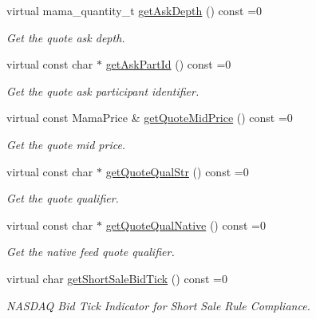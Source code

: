 \begin{CompactItemize}
virtual mama\_\-quantity\_\-t \hyperlink{classWombat_1_1MamdaQuoteUpdate_4728d3b913b7a8709feeb6863de56186}{get\-Ask\-Depth} () const =0
\begin{CompactList}\small\item\em Get the quote ask depth. \item\end{CompactList}\item 
virtual const char $\ast$ \hyperlink{classWombat_1_1MamdaQuoteUpdate_b1839344e3f8fa1339bffc169ed0fb2f}{get\-Ask\-Part\-Id} () const =0
\begin{CompactList}\small\item\em Get the quote ask participant identifier. \item\end{CompactList}\item 
virtual const Mama\-Price \& \hyperlink{classWombat_1_1MamdaQuoteUpdate_dacb69cdccb0a014856e8fadbcdf8c9c}{get\-Quote\-Mid\-Price} () const =0
\begin{CompactList}\small\item\em Get the quote mid price. \item\end{CompactList}\item 
virtual const char $\ast$ \hyperlink{classWombat_1_1MamdaQuoteUpdate_356eee4a4b6ba4480c542b8e93045cfb}{get\-Quote\-Qual\-Str} () const =0
\begin{CompactList}\small\item\em Get the quote qualifier. \item\end{CompactList}\item 
virtual const char $\ast$ \hyperlink{classWombat_1_1MamdaQuoteUpdate_393d0fb442ac45348fdeb6a6cba2a7ac}{get\-Quote\-Qual\-Native} () const =0
\begin{CompactList}\small\item\em Get the native feed quote qualifier. \item\end{CompactList}\item 
virtual char \hyperlink{classWombat_1_1MamdaQuoteUpdate_d57b32bde2b0fc0bbf5e28074112c0d8}{get\-Short\-Sale\-Bid\-Tick} () const =0
\begin{CompactList}\small\item\em NASDAQ Bid Tick Indicator for Short Sale Rule Compliance. \item\end{CompactList}\item 

\end{CompactItemize}
